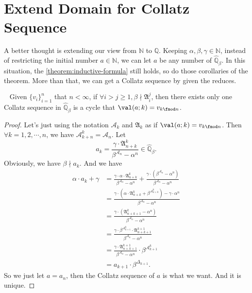 \section{Extend Domain for Collatz Sequence}\label{sec:extend-domain-for-collatz-sequence}

A better thought is extending our view from $\mathbb{N}$ to $\mathbb{Q}$.
Keeping $\alpha, \beta, \gamma \in \mathbb{N}$, instead of restricting the initial number $a \in \mathbb{N}$, we can let $a$ be any number of $\widehat{\mathbb{Q}}_{{\beta}}$.
In this situation, the \cref{theorem:inductive-formula} still holds, so do those corollaries of the theorem.
More than that, we can get a Collatz sequence by given the reduces.

\begin{theorem}~\label{theorem:any-cycle}
    Given $\{v_{i}\}_{i=1}^{n}$ that $n < \infty$, if $\forall i>j\ge1, \beta \nmid \mathfrak{A}_i^{j}$, then there exists only one Collatz sequence in $\widehat{\mathbb{Q}}_{{\beta}}$ is a cycle that $\val(a;k) = v_{k\fmod n}$.
\end{theorem}
\begin{proof}%
    Let's just using the notation $\mathcal{A}_k$ and $\mathfrak{A}_k$ as if $\val(a;k) = v_{k\fmod n}$.\newline
    Then $\forall k = 1, 2, \cdots, n$, we have $\mathcal{A}_{k + n}^{k} = \mathcal{A}_n$.
    Let
    \[ a_k = \frac{\gamma\cdot\mathfrak{A}_{n+k}^{k}}{\beta^{\mathcal{A}_n} - \alpha^n} \in \widehat{\mathbb{Q}}_{{\beta}}. \]
    Obviously, we have $\beta \nmid a_{k}$.
    And we have
    \begin{align*}
        \alpha\cdot a_{k} + \gamma &= \frac{\gamma\cdot\alpha\cdot\mathfrak{A}_{n+k}^{k}}{\beta^{\mathcal{A}_n} - \alpha^n} + \frac{\gamma\cdot(\beta^{\mathcal{A}_n} - \alpha^n)}{\beta^{\mathcal{A}_n} - \alpha^n} \\
        &= \frac{\gamma\cdot(\alpha\cdot\mathfrak{A}_{n+k}^{k}+\beta^{\mathcal{A}_{n+k}^{k}}) - \gamma\cdot\alpha^n}{\beta^{\mathcal{A}_n} - \alpha^n} \\
        &= \frac{\gamma\cdot(\mathfrak{A}_{n+k+1}^{k} - \alpha^{n})}{\beta^{\mathcal{A}_n} - \alpha^n} \\
        &= \frac{\gamma\cdot\beta^{\mathcal{A}_{k+1}^{k}}\cdot\mathfrak{A}_{n+k+1}^{k+1}}{\beta^{\mathcal{A}_n} - \alpha^n} \\
        &= \frac{\gamma\cdot\mathfrak{A}_{n+k+1}^{k+1}}{\beta^{\mathcal{A}_n} - \alpha^n}\cdot \beta^{\mathcal{A}_{k+1}^{k}} \\
        &= a_{k+1}\cdot \beta^{\Delta_{k+1}}.
    \end{align*}
    So we just let $a = a_{n}$, then the Collatz sequence of $a$ is what we want.
    And it is unique.
\end{proof}

